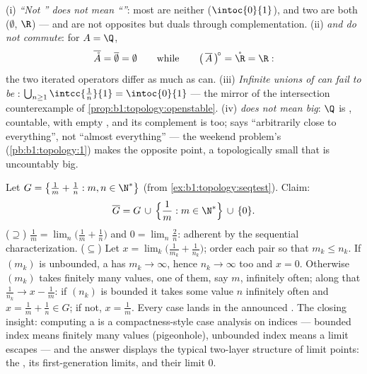 \begin{remark}
(i) \emph{``Not '' does not mean ``''}: most  are
neither ($\intoc{0}{1}$), and two  are both
($\emptyset$, $\R$) ---  and  are not opposites but
duals through complementation. (ii) \emph{ and 
do not commute}: for $A = \Q$,
\[
\overline{\mathring A} = \overline\emptyset = \emptyset
\qquad\text{while}\qquad
\bigl(\,\overline A\,\bigr)^{\!\circ} = \mathring \R = \R :
\]
the two iterated operators differ as much as  can. (iii)
\emph{Infinite unions of  can fail to be }:
$\bigcup_{n\geq1} \intcc{\frac1n}{1} = \intoc{0}{1}$ --- the
mirror of the intersection counterexample of
\cref{prop:b1:topology:openstable}. (iv) \emph{ does not
mean big}: $\Q$ is , countable, with empty , and
its complement is  too;  says ``arbitrarily close to
everything'', not ``almost everything'' --- the weekend problem's
 (\cref{pb:b1:topology:1}) makes the opposite point,
a topologically small  that is uncountably big.
\end{remark}

\begin{example}\label{ex:b1:topology:closurecomputed}
Let $G = \bigl\{\frac1m + \frac1n : m, n \in \N^*\bigr\}$ (from
\cref{ex:b1:topology:seqtest}). Claim:
\[
\overline G = G \,\cup\, \Bigl\{\frac1m : m \in \N^*\Bigr\}
\,\cup\, \{0\} .
\]
($\supseteq$) $\frac1m = \lim_n \bigl(\frac1m + \frac1n\bigr)$
and $0 = \lim_n \frac2n$: adherent by the sequential
characterization. ($\subseteq$) Let $x = \lim_k \bigl(
\frac{1}{m_k} + \frac{1}{n_k}\bigr)$; order each pair so that
$m_k \leq n_k$. If $(m_k)$ is unbounded, a  has $m_k
\to \infty$, hence $n_k \to \infty$ too and $x = 0$. Otherwise
$(m_k)$ takes finitely many values, one of them, say $m$,
infinitely often; along that  $\frac{1}{n_k} \to x -
\frac1m$: if $(n_k)$ is bounded it takes some value $n$
infinitely often and $x = \frac1m + \frac1n \in G$; if not, $x =
\frac1m$. Every case lands in the announced . The closing
insight: computing a  is a compactness-style case
analysis on indices --- bounded index means finitely many
values (pigeonhole), unbounded index means a limit escapes ---
and the answer displays the typical two-layer structure of
limit points: the , its first-generation limits, and their
limit $0$.
\end{example}

